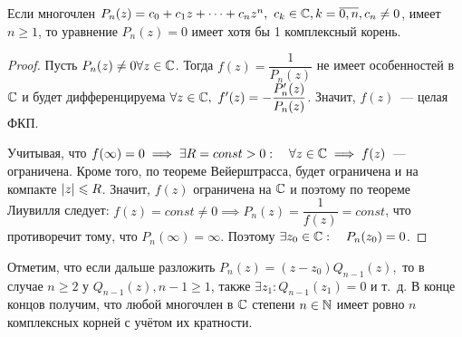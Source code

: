 \documentclass[../../main.tex]{subfiles}
\begin{document}
\begin{crl}
	Если многочлен $ P_n(z) = c_0 + c_1z + \dots + c_nz^n,\ c_k \in \mathbb{C},
	k = \overline{0, n}, c_n \neq 0 $, имеет $ n \geq 1 $, то уравнение $ P_n(z) = 0 $ имеет хотя бы 1 комплексный корень.
\end{crl}
\begin{proof}
	Пусть $ P_n(z) \neq 0 \forall z \in \mathbb{C} $.
	Тогда $ f(z) = \dfrac{1}{P_n(z)} $ не имеет особенностей в $ \mathbb{C} $ 
	и будет дифференцируема $ \forall z \in \mathbb{C},\
	f'(z) = -\dfrac{P_n'(z)}{P_n(z)} $. Значит, 
	$ f(z) $~--- целая ФКП.
	
	Учитывая, что $ f(\infty) = 0 \implies
	\exists R = const > 0:\quad \forall z \in \mathbb{C} \implies
	f(z) $~--- ограничена. Кроме того, по теореме Вейерштрасса, будет 
	ограничена и на компакте $ \left|{z}\right| \leqslant R $.
	Значит, $ f(z) $ ограничена на $ \mathbb{C} $ и поэтому по теореме Лиувилля следует:
	$ f(z) = const \neq 0 \implies P_n(z) = \dfrac{1}{f(z)} = const $, 
	что противоречит тому, что $ P_n(\infty)  = \infty $. Поэтому $ 
	\exists z_0 \in \mathbb{C}:\quad P_n(z_0) = 0 $.
\end{proof}

Отметим, что если дальше разложить $ P_n(z) = (z - z_0)Q_{n - 1}(z), $ 
то в случае $ n \geq 2 $ у $ Q_{n - 1}(z), n - 1 \geq 1 $, 
также $ \exists z_1 : Q_{n - 1}(z_1) = 0 $ и т.~д.
В конце концов получим, что любой многочлен в $ \mathbb{C} $ степени $ n \in \mathbb{N} $ имеет 
ровно $ n $ комплексных корней с учётом их кратности.
\end{document}
